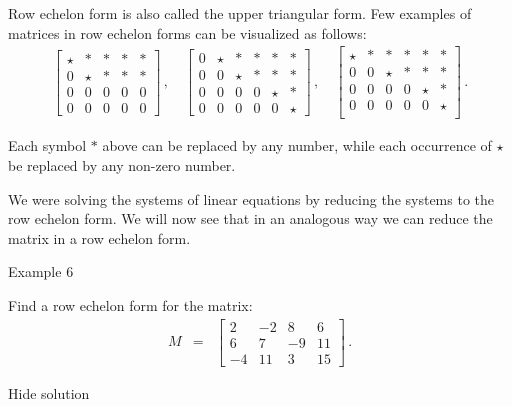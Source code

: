 Row echelon form is also called the upper triangular form. Few examples of matrices in row echelon forms can be visualized as follows: \begin{eqnarray*} \left[\begin{array}{ccccc} \star & \ast & \ast &\ast &\ast\\ 0&\star&\ast & \ast &\ast\\ 0&0&0&0&0\\ 0&0&0&0&0 \end{array}\right]\,, \quad \left[\begin{array}{cccccc} 0&\star & \ast & \ast &\ast &\ast\\ 0&0&\star&\ast & \ast &\ast\\ 0&0&0&0&\star&\ast\\ 0&0&0&0&0&\star \end{array}\right]\,, \quad \left[\begin{array}{cccccc} \star & \ast & \ast &\ast &\ast&\ast\\ 0&0&\star&\ast & \ast &\ast\\ 0&0&0&0&\star&\ast\\ 0&0&0&0&0&\star\\ \end{array}\right]\,. \end{eqnarray*}

Each symbol \( \ast \) above can be replaced by any number, while each occurrence of \( \star \) be replaced by any non-zero number.

We were solving the systems of linear equations by reducing the systems to the row echelon form. We will now see that in an analogous way we can reduce the matrix in a row echelon form.

Example 6


Find a row echelon form for the matrix: \begin{eqnarray*} M&=&\left[\begin{array}{cccc}2&-2&8&6\\ 6&7&-9&11\\ -4&11&3&15\end{array}\right]\,. \end{eqnarray*}

Hide solution


